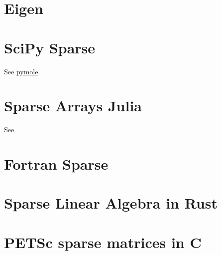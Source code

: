 \section{Eigen}

\section{SciPy Sparse}

See \href{https://github.com/nutrik/pymole}{pymole}.

\section{Sparse Arrays Julia}

See \href{https://robertsweeneyblanco.github.io/Programming_for_Mathematical_Applications/content/Sparse_Matrices/Sparse_Matrices_In_Julia.html}{}

\section{Fortran Sparse}

\section{Sparse Linear Algebra in Rust}


\section{PETSc sparse matrices in C}

\nocite{*}
\printbibliography[title={References}]
